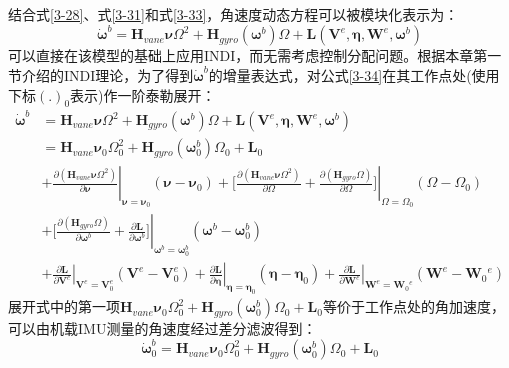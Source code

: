 结合式\eqref{3-28}、式\eqref{3-31}和式\eqref{3-33}，角速度动态方程可以被模块化表示为：
\begin{equation}
    \boldsymbol{\dot{\omega}}^b=\boldsymbol{H}_{vane}\boldsymbol{\nu}\Omega^2+\boldsymbol{H}_{gyro}(\boldsymbol{\omega}^b)\Omega+\boldsymbol{L}(\boldsymbol{V}^e,\boldsymbol{\eta},\boldsymbol{W}^e,\boldsymbol{\omega}^b)
    \label{3-34}
\end{equation}
可以直接在该模型的基础上应用INDI，而无需考虑控制分配问题。根据本章第一节介绍的INDI理论，为了得到$\boldsymbol{\dot{\omega}}^b$的增量表达式，对公式\eqref{3-34}在其工作点处(使用下标$(.)_0$表示)作一阶泰勒展开：
\begin{equation}
    \begin{aligned}
    \boldsymbol{\dot{\omega}}^b&=\boldsymbol{H}_{vane}\boldsymbol{\nu}\Omega^2+\boldsymbol{H}_{gyro}(\boldsymbol{\omega}^b)\Omega+\boldsymbol{L}(\boldsymbol{V}^e,\boldsymbol{\eta},\boldsymbol{W}^e,\boldsymbol{\omega}^b)\\
    &=\boldsymbol{H}_{vane}\boldsymbol{\nu}_0\Omega_0^2+\boldsymbol{H}_{gyro}(\boldsymbol{\omega}_0^b)\Omega_0+\boldsymbol{L}_0\\
    & +\left.\frac{\partial(\boldsymbol{H}_{vane}\boldsymbol{\nu}\Omega^2)}{\partial\boldsymbol{\nu}}\right|_{\boldsymbol{\nu}=\boldsymbol{\nu}_0}(\boldsymbol{\nu}-\boldsymbol{\nu}_0)
    +\left.\bigg[\frac{\partial(\boldsymbol{H}_{vane}\boldsymbol{\nu}\Omega^2)}{\partial\Omega}+\frac{\partial(\boldsymbol{H}_{gyro}\Omega)}{\partial\Omega}\bigg]\right|_{\Omega=\Omega_0}
    (\Omega-\Omega_0) \\
     & +\left.\bigg[\frac{\partial(\boldsymbol{H}_{gyro}\Omega)}{\partial\boldsymbol{\omega}^{b}}+\frac{\partial\boldsymbol{L}}{\partial\boldsymbol{\omega}^{b}}\bigg]\right|_{\boldsymbol{\omega}^{b}=\boldsymbol{\omega}_{0}^{b}}(\boldsymbol{\omega}^{b}-\boldsymbol{\omega}_{0}^{b})\\
    & +\left.\frac{\partial\boldsymbol{L}}{\partial\boldsymbol{V}^{e}}\right|_{\boldsymbol{V}^{e}=\boldsymbol{V}_{0}^{e}}
    (\boldsymbol{V}^{e}-\boldsymbol{V}_{0}^{e})
    +\left.\frac{\partial\boldsymbol{L}}{\partial\boldsymbol{\eta}}\right|_{\boldsymbol{\eta}=\boldsymbol{\eta}_{0}}(\boldsymbol{\eta}-\boldsymbol{\eta}_{0})
    +\left. \frac{\partial\boldsymbol{L}}{\partial\boldsymbol{W}^e}\right|_{\boldsymbol{W}^e=\boldsymbol{W}_0{}^e}(\boldsymbol{W}^e-\boldsymbol{W}_0{}^e)
    \end{aligned}
    \label{3-35}
\end{equation}
展开式中的第一项$\boldsymbol{H}_{vane}\boldsymbol{\nu}_0\Omega_0^2+\boldsymbol{H}_{gyro}(\boldsymbol{\omega}_0^b)\Omega_0+\boldsymbol{L}_0$等价于工作点处的角加速度，可以由机载IMU测量的角速度经过差分滤波得到：
\begin{equation}
    \boldsymbol{\dot{\omega}}^b_0=\boldsymbol{H}_{vane}\boldsymbol{\nu}_0\Omega_0^2+\boldsymbol{H}_{gyro}(\boldsymbol{\omega}_0^b)\Omega_0+\boldsymbol{L}_0
    \label{3-36}
\end{equation}

